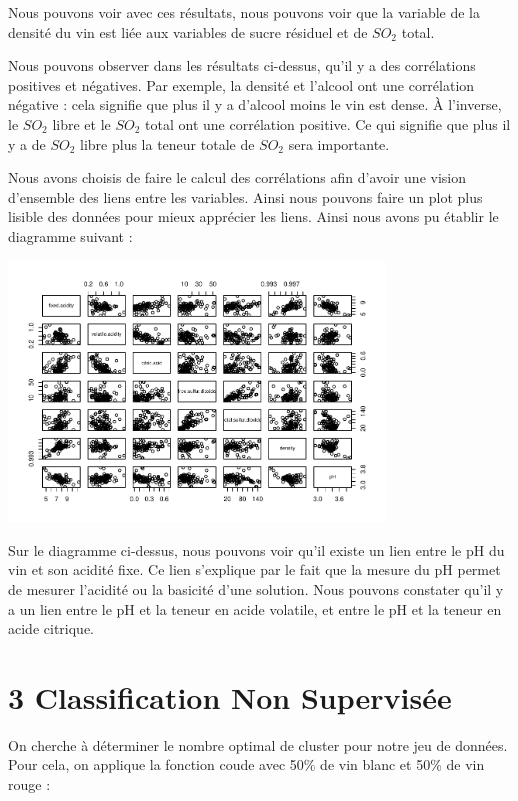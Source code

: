 \documentclass[
]{article}
\begin{document}
Nous pouvons voir avec ces résultats, nous pouvons voir que la variable
de la densité du vin est liée aux variables de sucre résiduel et de
\(SO_2\) total.

Nous pouvons observer dans les résultats ci-dessus, qu'il y a des
corrélations positives et négatives. Par exemple, la densité et l'alcool
ont une corrélation négative : cela signifie que plus il y a d'alcool
moins le vin est dense. À l'inverse, le \(SO_2\) libre et le \(SO_2\)
total ont une corrélation positive. Ce qui signifie que plus il y a de
\(SO_2\) libre plus la teneur totale de \(SO_2\) sera importante.

Nous avons choisis de faire le calcul des corrélations afin d'avoir une
vision d'ensemble des liens entre les variables. Ainsi nous pouvons
faire un plot plus lisible des données pour mieux apprécier les liens.
Ainsi nous avons pu établir le diagramme suivant :

\begin{center}
	\includegraphics[width=10cm]{repport_files/figure-latex/unnamed-chunk-4-1.pdf}
\end{center}

Sur le diagramme ci-dessus, nous pouvons voir qu'il existe un lien entre
le pH du vin et son acidité fixe. Ce lien s'explique par le fait que la
mesure du pH permet de mesurer l'acidité ou la basicité d'une solution.
Nous pouvons constater qu'il y a un lien entre le pH et la teneur en
acide volatile, et entre le pH et la teneur en acide citrique.
\newpage
\hypertarget{classification-non-supervisuxe9e}{%
\section{3 Classification Non
Supervisée}\label{classification-non-supervisuxe9e}}

On cherche à déterminer le nombre optimal de cluster pour notre jeu de
données. Pour cela, on applique la fonction coude avec 50\% de vin blanc
et 50\% de vin rouge :
\end{document}
